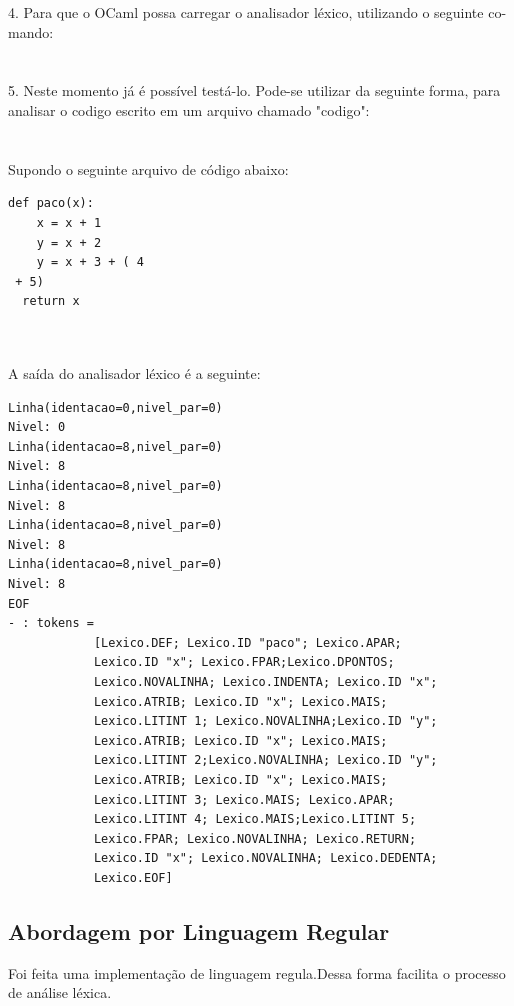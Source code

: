 \documentclass{article}
\begin{document}
4. Para que o OCaml possa carregar o analisador léxico, utilizando o seguinte co-
mando:\\
\\\\

5. Neste momento já é possível testá-lo. Pode-se utilizar da seguinte forma, para analisar
o codigo escrito em um arquivo chamado "codigo":\\
\\\\


Supondo o seguinte arquivo de código abaixo:

\begin{lstlisting}
def paco(x):
    x = x + 1
    y = x + 2
    y = x + 3 + ( 4
 + 5)
  return x
\end{lstlisting}

\\\\A saída do analisador léxico é a seguinte:
\begin{lstlisting}
Linha(identacao=0,nivel_par=0)
Nivel: 0
Linha(identacao=8,nivel_par=0)
Nivel: 8
Linha(identacao=8,nivel_par=0)
Nivel: 8
Linha(identacao=8,nivel_par=0)
Nivel: 8
Linha(identacao=8,nivel_par=0)
Nivel: 8
EOF
- : tokens =
            [Lexico.DEF; Lexico.ID "paco"; Lexico.APAR; 
            Lexico.ID "x"; Lexico.FPAR;Lexico.DPONTOS; 
            Lexico.NOVALINHA; Lexico.INDENTA; Lexico.ID "x";
            Lexico.ATRIB; Lexico.ID "x"; Lexico.MAIS; 
            Lexico.LITINT 1; Lexico.NOVALINHA;Lexico.ID "y";
            Lexico.ATRIB; Lexico.ID "x"; Lexico.MAIS; 
            Lexico.LITINT 2;Lexico.NOVALINHA; Lexico.ID "y";
            Lexico.ATRIB; Lexico.ID "x"; Lexico.MAIS;
            Lexico.LITINT 3; Lexico.MAIS; Lexico.APAR;
            Lexico.LITINT 4; Lexico.MAIS;Lexico.LITINT 5;
            Lexico.FPAR; Lexico.NOVALINHA; Lexico.RETURN;
            Lexico.ID "x"; Lexico.NOVALINHA; Lexico.DEDENTA;
            Lexico.EOF]
\end{lstlisting}

\subsection{Abordagem por Linguagem Regular}
Foi feita uma implementação de linguagem regula.Dessa forma facilita
o processo de análise léxica.\\\\
\end{document}
